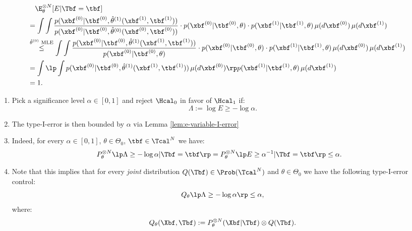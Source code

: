 \begin{Prn}
\begin{enumerate}
    \end{enumerate}
    \begin{align*}
        &\quad \E_\theta^{\otimes N}[E|\Tbf=\tbf] \\ 
        & = \int\int \frac{p(\xbf^{(0)}|\tbf^{(0)},\hat \theta^{(1)}(\xbf^{(1)},\tbf^{(1)}))}{p(\xbf^{(0)}|\tbf^{(0)},\hat \theta^{(0)}(\xbf^{(0)},\tbf^{(0)}))} \cdot p(\xbf^{(0)}|\tbf^{(0)},\theta)\cdot p(\xbf^{(1)}|\tbf^{(1)},\theta) \,\mu(d\xbf^{(0)})\,\mu(d\xbf^{(1)}) \\ 
        & \stackrel{\hat \theta^{(0)} \text{ MLE}}{\le} \int\int \frac{p(\xbf^{(0)}|\tbf^{(0)},\hat \theta^{(1)}(\xbf^{(1)},\tbf^{(1)}))}{p(\xbf^{(0)}|\tbf^{(0)},\theta)} \cdot p(\xbf^{(0)}|\tbf^{(0)},\theta)\cdot p(\xbf^{(1)}|\tbf^{(1)},\theta) \,\mu(d\xbf^{(0)})\,\mu(d\xbf^{(1)}) \\ 
        & =  \int \lp\int p(\xbf^{(0)}|\tbf^{(0)},\hat \theta^{(1)}(\xbf^{(1)},\tbf^{(1)})) \,\mu(d\xbf^{(0)}) \rp p(\xbf^{(1)}|\tbf^{(1)},\theta) \,\mu(d\xbf^{(1)}) \\
        & =1.
    \end{align*}
    \begin{enumerate}[resume]
\item Pick a significance level $\alpha \in [0,1]$ and reject $\Hcal_0$ in favor of $\Hcal_1$ if:
         \[ \Lambda:=\log E \ge - \log \alpha. \] 
 \item The type-I-error is then bounded by $\alpha$ via Lemma \ref{lem:e-variable-I-error} 
\item[]  Indeed, for every $\alpha \in [0,1]$, $\theta \in \Theta_0$, $\tbf \in \Tcal^N$ we have: 
         \begin{align*} 
             P_\theta^{\otimes N}\lp \Lambda \ge - \log \alpha |\Tbf=\tbf  \rp 
             &= P_\theta^{\otimes N} \lp E \ge \alpha^{-1} |\Tbf=\tbf \rp \le \alpha. %
         \end{align*}
\item[] Note that this implies that for every \emph{joint} distribution
    $Q(\Tbf) \in \Prob(\Tcal^N)$ and $\theta \in \Theta_0$ we have the following type-I-error control:
    \[ Q_\theta \lp \Lambda \ge - \log \alpha  \rp \le \alpha, \]
    where:
    \[ Q_\theta(\Xbf,\Tbf) := P_\theta^{\otimes N}(\Xbf|\Tbf) \otimes Q(\Tbf).\]
    \end{enumerate}
\end{Prn}

